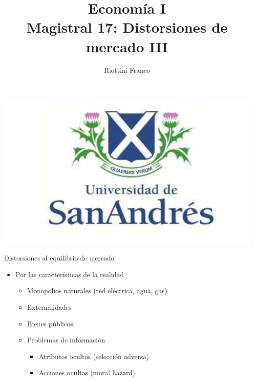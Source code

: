 \documentclass{beamer}
\title[Economía I]{Economía I \vspace{4mm}
\\ Magistral 17: Distorsiones de mercado III}
\date{}
\author[Riottini]{Riottini Franco}
\institute[]{Universidad de San Andrés}
\begin{document}
\begin{frame}
\titlepage
\centering
\includegraphics[scale=0.2]{../Figures/logoUDESA.jpg} 
\end{frame}

\begin{frame}{Distorsiones al equilibrio de mercado}
    \begin{itemize}
        \item Por las características de la realidad \vspace{1mm}
        \begin{itemize}
            \item Monopolios naturales (red eléctrica, agua, gas)   
             \vspace{1mm}
            \item Externalidades
             \vspace{1mm}
            \item Bienes públicos
            \vspace{1mm}
            \item Problemas de información
            \begin{itemize}
                \item Atributos ocultos (selección adversa)
                 \vspace{1mm}
                \item Acciones ocultas (moral hazard)
            \end{itemize}        
        \end{itemize}
    \end{itemize}
\end{frame}
\end{document}
